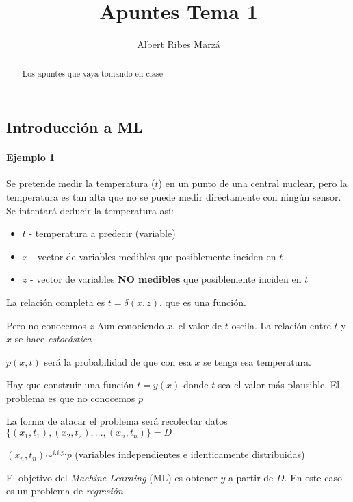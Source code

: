 \documentclass[a4paper,10pt]{article}
\title{Apuntes Tema 1}
\author{Albert Ribes Marzá}
\begin{document}
\maketitle

\begin{abstract}
Los apuntes que vaya tomando en clase
\end{abstract}

\section{}
\subsection{Introducción a ML}
\paragraph{Ejemplo 1}
Se pretende medir la temperatura ($t$) en un punto de una central nuclear, pero la temperatura es tan alta que no se puede medir directamente con ningún sensor. Se intentará deducir la temperatura así:
\begin{itemize}
\item $t$ - temperatura a predecir (variable)
\item $x$ - vector de variables medibles que posiblemente inciden en $t$
\item $z$ - vector de variables \textbf{NO medibles} que posiblemente inciden en $t$
\end{itemize}

La relación completa es $ t = \delta(x,z)$, que es una función.

Pero no conocemos $z$ \MVRightarrow Aun conociendo $x$, el valor de $t$ oscila. La relación entre $t$ y $x$ se hace \textit{estocástica}

$p(x,t)$ será la probabilidad de que con esa $x$ se tenga esa temperatura.

Hay que construir una función $t = y(x)$ donde $t$ sea el valor más plausible. El problema es que no conocemos $p$

La forma de atacar el problema será recolectar datos $\{(x_1, t_1),(x_2, t_2), \dots ,(x_n, t_n)\} = D$

$(x_n,t_n) \sim^{i.i.p.} p$ (variables independientes e identicamente distribuidas)


El objetivo del \textit{Machine Learning} (ML) es obtener $y$ a partir de $D$. En este caso es un problema de \textit{regresión}
\end{document}
